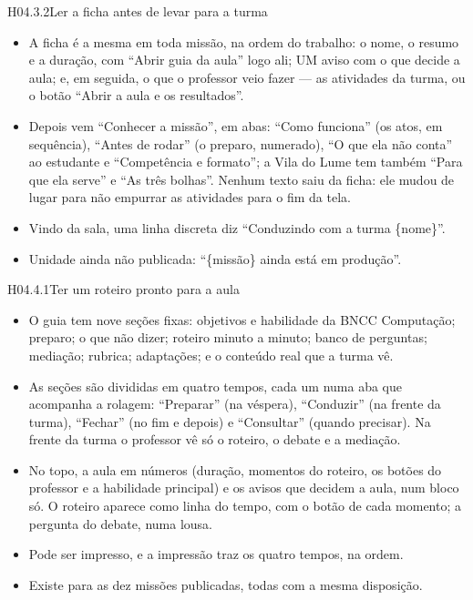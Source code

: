 \begin{historia}{H04.3.2}{Ler a ficha antes de levar para a turma}{\pronto}
\aceite
\begin{itemize}
  \item A ficha é a mesma em toda missão, na ordem do trabalho: o nome, o
    resumo e a duração, com \enquote{Abrir guia da aula} logo ali; UM aviso
    com o que decide a aula; e, em seguida, o que o professor veio fazer ---
    as atividades da turma, ou o botão \enquote{Abrir a aula e os
    resultados}.
  \item Depois vem \enquote{Conhecer a missão}, em abas: \enquote{Como
    funciona} (os atos, em sequência), \enquote{Antes de rodar} (o preparo,
    numerado), \enquote{O que ela não conta} ao estudante e
    \enquote{Competência e formato}; a Vila do Lume tem também \enquote{Para
    que ela serve} e \enquote{As três bolhas}. Nenhum texto saiu da ficha:
    ele mudou de lugar para não empurrar as atividades para o fim da tela.
  \item Vindo da sala, uma linha discreta diz \enquote{Conduzindo com a turma
    \{nome\}}.
  \item Unidade ainda não publicada: \enquote{\{missão\} ainda está em
    produção}.
\end{itemize}
\end{historia}


\begin{historia}{H04.4.1}{Ter um roteiro pronto para a aula}{\pronto}
\aceite
\begin{itemize}
  \item O guia tem nove seções fixas: objetivos e habilidade da BNCC
    Computação; preparo; o que não dizer; roteiro minuto a minuto; banco de
    perguntas; mediação; rubrica; adaptações; e o conteúdo real que a turma
    vê.
  \item As seções são divididas em quatro tempos, cada um numa aba que
    acompanha a rolagem: \enquote{Preparar} (na véspera), \enquote{Conduzir}
    (na frente da turma), \enquote{Fechar} (no fim e depois) e
    \enquote{Consultar} (quando precisar). Na frente da turma o professor vê
    só o roteiro, o debate e a mediação.
  \item No topo, a aula em números (duração, momentos do roteiro, os botões do
    professor e a habilidade principal) e os avisos que decidem a aula, num
    bloco só. O roteiro aparece como linha do tempo, com o botão de cada
    momento; a pergunta do debate, numa lousa.
  \item Pode ser impresso, e a impressão traz os quatro tempos, na ordem.
  \item Existe para as dez missões publicadas, todas com a mesma disposição.
\end{itemize}
\end{historia}
